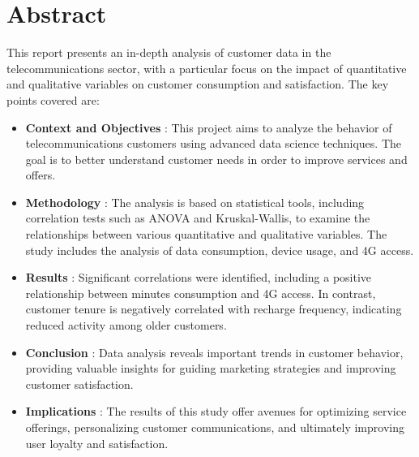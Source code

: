 \chapter*{Abstract}
This report presents an in-depth analysis of customer data in the telecommunications sector, with a particular focus on the impact of quantitative and qualitative variables on customer consumption and satisfaction. The key points covered are:

\begin{itemize}
    \item \textbf{Context and Objectives} : This project aims to analyze the behavior of telecommunications customers using advanced data science techniques. The goal is to better understand customer needs in order to improve services and offers.
    
    \item \textbf{Methodology} : The analysis is based on statistical tools, including correlation tests such as ANOVA and Kruskal-Wallis, to examine the relationships between various quantitative and qualitative variables. The study includes the analysis of data consumption, device usage, and 4G access.
    
    \item \textbf{Results} : Significant correlations were identified, including a positive relationship between minutes consumption and 4G access. In contrast, customer tenure is negatively correlated with recharge frequency, indicating reduced activity among older customers.
    
    \item \textbf{Conclusion} : Data analysis reveals important trends in customer behavior, providing valuable insights for guiding marketing strategies and improving customer satisfaction.
    
    \item \textbf{Implications} : The results of this study offer avenues for optimizing service offerings, personalizing customer communications, and ultimately improving user loyalty and satisfaction.
\end{itemize}


